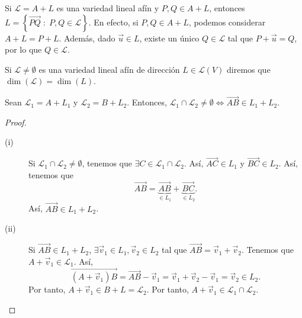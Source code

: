 \begin{observation}
	\normalfont Si $\displaystyle \mathcal{L} = A + L $ es una variedad lineal afín y $\displaystyle P,Q \in A + L $, entonces $\displaystyle L = \left\{ \overrightarrow{PQ} \; : \; P,Q \in \mathcal{L}\right\}  $. En efecto, si $\displaystyle P,Q \in A + L $, podemos considerar $\displaystyle A + L = P + L $. Además, dado $\displaystyle \vec{u} \in L $, existe un único $\displaystyle Q \in \mathcal{L} $ tal que $\displaystyle P + \vec{u} = Q $, por lo que $\displaystyle Q \in \mathcal{L} $.  
\end{observation}
\begin{fdefinition}
\normalfont Si $\displaystyle \mathcal{L} \neq \emptyset $ es una variedad lineal afín de dirección $\displaystyle L \in \mathcal{L}\left(V\right) $ diremos que $\displaystyle \dim\left(\mathcal{L}\right) = \dim\left(L\right) $.
\end{fdefinition}
\begin{ftheorem}[]
	\normalfont Sean $\displaystyle \mathcal{L}_{1} = A + L_{1} $ y $\displaystyle \mathcal{L}_{2} = B + L_{2} $. Entonces, $\displaystyle \mathcal{L}_{1} \cap \mathcal{L}_{2} \neq \emptyset \iff \overrightarrow{AB} \in L_{1} + L_{2}$.
\end{ftheorem}
\begin{proof}
\begin{description}
	\item[(i)] Si $\displaystyle \mathcal{L}_{1} \cap \mathcal{L}_{2} \neq \emptyset $, tenemos que $\displaystyle \exists C \in \mathcal{L}_{1} \cap \mathcal{L}_{2} $. Así, $\displaystyle \overrightarrow{AC} \in L_{1} $ y $\displaystyle \overrightarrow{BC} \in L_{2} $. Así, tenemos que 
		\[\overrightarrow{AB} = \underbrace{\overrightarrow{AB}}_{\in L_{1}} + \underbrace{\overrightarrow{BC}}_{\in L_{2}} .\]
		Así, $\displaystyle \overrightarrow{AB} \in L_{1} + L_{2} $.
	\item[(ii)] Si $\displaystyle \overrightarrow{AB} \in L_{1} + L_{2} $, $\displaystyle \exists \vec{v}_{1} \in L_{1}, \vec{v}_{2} \in L_{2} $ tal que $\displaystyle \overrightarrow{AB} = \vec{v}_{1} +\vec{v}_{2} $. Tenemos que $\displaystyle A + \vec{v}_{1} \in \mathcal{L}_{1} $. Así,
		\[ \overrightarrow{\left(A + \vec{v}_{1}\right)B} = \overrightarrow{AB} - \vec{v}_{1} = \vec{v}_{1} +\vec{v}_{2} -\vec{v}_{1} = \vec{v}_{2} \in L_{2} .\]
		Por tanto, $\displaystyle A + \vec{v}_{1} \in B + L = \mathcal{L}_{2}$. Por tanto, $\displaystyle A + \vec{v}_{1} \in \mathcal{L}_{1} \cap \mathcal{L}_{2} $.
\end{description}
\end{proof}
